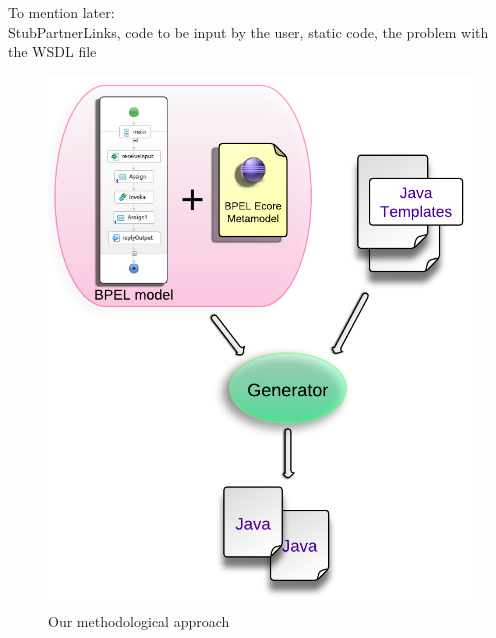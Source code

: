  To mention later: \\
 StubPartnerLinks, code to be input by the user, static code, the problem with the WSDL file

\begin{figure}[h!]
  \begin{center}
    \includegraphics[scale=0.9]{pictures/TransformationApproach.png}
    \caption{Our methodological approach}
    \label{fig:TransformationApproach}
  \end{center}
\end{figure}